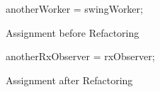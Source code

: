 \begin{figure}[H]
\begin{minipage}{0.48\textwidth}
\begin{sourcecode}
\begin{javacode}{}
anotherWorker = swingWorker;
\end{javacode}
\caption{Assignment before Refactoring}
\label{code:assigment-before}
\end{sourcecode}
\end{minipage}\hspace{0.7cm}
\begin{minipage}{0.48\textwidth}
\begin{sourcecode}
\begin{javacode}{}
anotherRxObserver = rxObserver;
\end{javacode}
\caption{Assignment after Refactoring}
\label{code:assigment-after}
\end{sourcecode}
\end{minipage}
\end{figure}